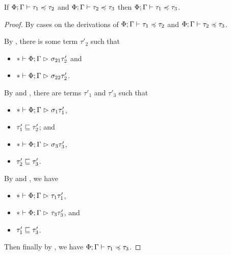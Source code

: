 \begin{theorem} \label{thm:transitivity-subtyping}
If $\Phi; \Gamma \mathrel{\vdash} \tau_1 \mathrel{\preccurlyeq} \tau_2$ and $\Phi; \Gamma \mathrel{\vdash} \tau_2 \mathrel{\preccurlyeq} \tau_3$
then $\Phi; \Gamma \mathrel{\vdash} \tau_1 \mathrel{\preccurlyeq} \tau_3$.
\end{theorem}

\begin{proof}
By cases on the derivations of $\Phi; \Gamma \mathrel{\vdash} \tau_1 \mathrel{\preccurlyeq} \tau_2$
and $\Phi; \Gamma \mathrel{\vdash} \tau_2 \mathrel{\preccurlyeq} \tau_3$.
By , there is some term $\tau'_2$ such that
\begin{itemize}[noitemsep]
  \item $* \mathrel{\vdash} \Phi; \Gamma \mathrel{\rhd}_{} \sigma_{21}{\tau'_2}$ and
  \item $* \mathrel{\vdash} \Phi; \Gamma \mathrel{\rhd}_{} \sigma_{22}{\tau'_2}$.
\end{itemize}
By  and ,
there are terms $\tau'_1$ and $\tau'_3$ such that
\begin{itemize}[noitemsep]
  \item $* \mathrel{\vdash} \Phi; \Gamma \mathrel{\rhd}_{} \sigma_1{\tau'_1}$,
  \item $\tau'_1 \mathrel{\sqsubseteq} \tau'_2$; and
  \item $* \mathrel{\vdash} \Phi; \Gamma \mathrel{\rhd}_{} \sigma_3{\tau'_3}$,
  \item $\tau'_2 \mathrel{\sqsubseteq} \tau'_3$.
\end{itemize}
By  and , we have
\begin{itemize}[noitemsep]
  \item $* \mathrel{\vdash} \Phi; \Gamma \mathrel{\rhd}_{} \tau_1{\tau'_1}$,
  \item $* \mathrel{\vdash} \Phi; \Gamma \mathrel{\rhd}_{} \tau_3{\tau'_3}$, and
  \item $\tau'_1 \mathrel{\sqsubseteq} \tau'_3$.
\end{itemize}
Then finally by , we have $\Phi; \Gamma \mathrel{\vdash} \tau_1 \mathrel{\preccurlyeq} \tau_3$.
\end{proof}

